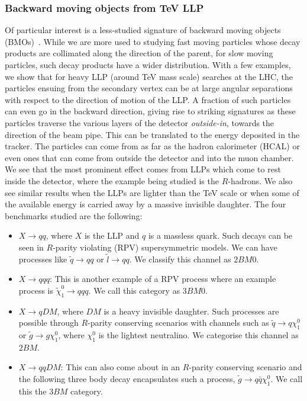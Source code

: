 \documentclass[10pt]{article}
\begin{document}
\subsubsection{Backward moving objects from TeV LLP}
%
Of particular interest is a less-studied signature of backward moving objects (BMOs)~\cite{Banerjee:2017hmw}. While we are more used to studying fast moving particles whose decay products are collimated along the direction of the parent, for slow moving particles, such decay products have a wider distribution. With a few examples, we show that for heavy LLP (around TeV mass scale) searches at the LHC, the particles ensuing from the secondary vertex can be at large angular separations with respect to the direction of motion of the LLP. A fraction of such particles can even go in the backward direction, giving rise to striking signatures as these particles traverse the various layers of the detector \textit{outside-in}, towards the direction of the beam pipe. This can be translated to the energy deposited in the tracker. The particles can come from as far as the hadron calorimeter (HCAL) or even ones that can come from outside the detector and into the muon chamber. We see that the most prominent effect comes from LLPs which come to rest inside the detector, where the example being studied is the $R$-hadrons. We also see similar results when the LLPs are lighter than the TeV scale or when some of the available energy is carried away by a massive invisible daughter. The four benchmarks studied are the following:
\begin{itemize}
	\item $X \to qq$, where $X$ is the LLP and $q$ is a massless quark. Such decays can be seen in $R$-parity violating (RPV) supersymmetric models. We can have processes like $\tilde{q} \to qq$ or $\tilde{l} \to qq$. We classify this channel as $2BM0$.
	\item $X \to qqq$: This is another example of a RPV process where an example process is $\tilde{\chi}_1^0 \to qqq$. We call this category as $3BM0$.
	\item $X \to q DM$, where $DM$ is a heavy invisible daughter. Such processes are possible through $R$-parity conserving scenarios with channels such as $\tilde{q} \to q \chi_1^0$ or $\tilde{g} \to g \chi_1^0$, where $\chi_1^0$ is the lightest neutralino. We categorise this channel as $2BM$.
	\item $X \to qq DM$: This can also come about in an $R$-parity conserving scenario and the following three body decay encapsulates such a process, $\tilde{g} \to q\bar{q} \chi_1^0$. We call this the $3BM$ category.
\end{itemize}
\end{document}
